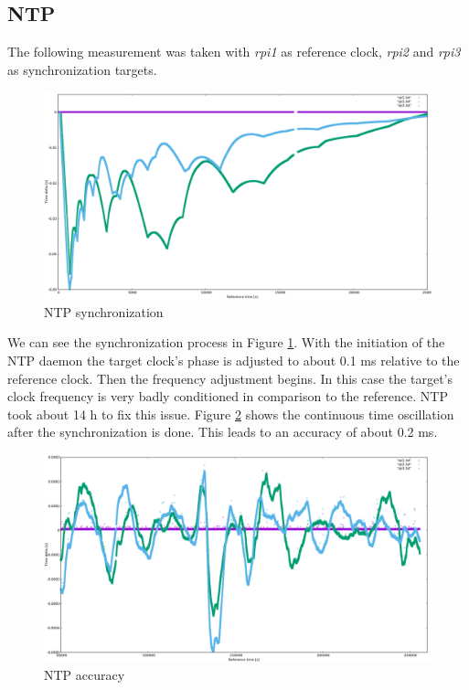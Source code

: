 \subsection{NTP}

The following measurement was taken with \textit{rpi1} as reference clock, \textit{rpi2} and \textit{rpi3} as synchronization targets.

\begin{figure}[H]
	\centering
	\includegraphics[width=1.0\textwidth]{figures/plot_ntp1.png}
	\caption{NTP synchronization}
	\label{fig:plot_ntp1}
\end{figure}

We can see the synchronization process in Figure \ref{fig:plot_ntp1}. With the initiation of the NTP daemon the target clock's phase is adjusted to about 0.1 ms relative to the reference clock. Then the frequency adjustment begins. In this case the target's clock frequency is very badly conditioned in comparison to the reference. NTP took about 14 h to fix this issue. Figure \ref{fig:plot_ntp2} shows the continuous time oscillation after the synchronization is done. This leads to an accuracy of about 0.2 ms.

\begin{figure}[H]
	\centering
	\includegraphics[width=1.0\textwidth]{figures/plot_ntp2.png}
	\caption{NTP accuracy}
	\label{fig:plot_ntp2}
\end{figure}

